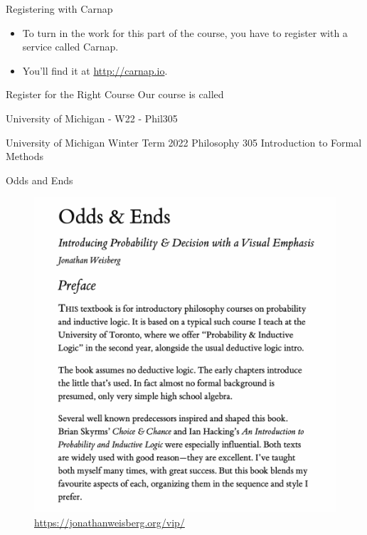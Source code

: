 \documentclass[
  ignorenonframetext,
]{beamer}
\providecommand{\tightlist}{%
  \setlength{\itemsep}{0pt}\setlength{\parskip}{0pt}}
\renewcommand{\,}{\text{, }}
\renewenvironment*{quote}	
	{\list{}{\rightmargin   \leftmargin} \item } 	
	{\endlist }
\begin{document}
\begin{frame}{Registering with Carnap}
\protect\hypertarget{registering-with-carnap}{}
\begin{itemize}
\tightlist
\item
  To turn in the work for this part of the course, you have to register
  with a service called Carnap.
\item
  You'll find it at \url{http://carnap.io}.
\end{itemize}
\end{frame}

\begin{frame}{Register for the Right Course}
\protect\hypertarget{register-for-the-right-course}{}
Our course is called

\begin{quote}
University of Michigan - W22 - Phil305

University of Michigan Winter Term 2022 Philosophy 305 Introduction to
Formal Methods
\end{quote}
\end{frame}

\begin{frame}{Odds and Ends}
\protect\hypertarget{odds-and-ends}{}
\begin{figure}
\centering
\includegraphics[width=\textwidth,height=0.8\textheight]{../images/1_1_Odds_and_Ends.png}
\caption{\url{https://jonathanweisberg.org/vip/}}
\end{figure}
\end{frame}
\end{document}
